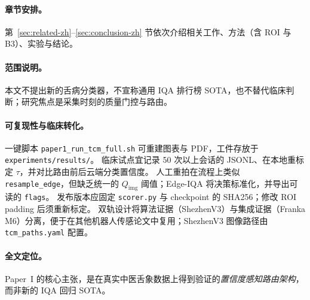 \paragraph{章节安排。}
第~\ref{sec:related-zh}--\ref{sec:conclusion-zh} 节依次介绍相关工作、方法（含 ROI 与 B3）、实验与结论。

\paragraph{范围说明。}
本文不提出新的舌病分类器，不宣称通用 IQA 排行榜 SOTA，也不替代临床判断；研究焦点是采集时刻的质量门控与路由。

\paragraph{可复现性与临床转化。}
一键脚本 \texttt{paper1\_run\_tcm\_full.sh} 可重建图表与 PDF，工件存放于 \texttt{experiments/results/}。
临床试点宜记录 50 次以上会话的 JSONL、在本地重标定 $\tau$，并对比路由前后云端分类置信度。
人工重拍在流程上类似 \texttt{resample\_edge}，但缺乏统一的 $Q_{\mathrm{img}}$ 阈值；Edge-IQA 将决策标准化，并导出可读的 \texttt{flags}。
发布版本应固定 \texttt{scorer.py} 与 checkpoint 的 SHA256；修改 ROI padding 后须重新标定。
双轨设计将算法证据（ShezhenV3）与集成证据（Franka M6）分离，便于在其他机器人传感论文中复用；ShezhenV3 图像路径由 \texttt{tcm\_paths.yaml} 配置。

\paragraph{全文定位。}
Paper~I 的核心主张，是在真实中医舌象数据上得到验证的\emph{置信度感知路由架构}，而非新的 IQA 回归 SOTA。
